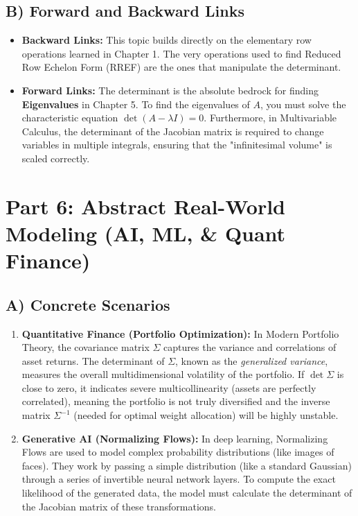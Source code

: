 \documentclass{article}
\begin{document}
\subsection{B) Forward and Backward Links}
\begin{itemize}
    \item \textbf{Backward Links:} This topic builds directly on the elementary row operations learned in Chapter 1. The very operations used to find Reduced Row Echelon Form (RREF) are the ones that manipulate the determinant.
    \item \textbf{Forward Links:} The determinant is the absolute bedrock for finding \textbf{Eigenvalues} in Chapter 5. To find the eigenvalues of $A$, you must solve the characteristic equation $\det(A - \lambda I) = 0$. Furthermore, in Multivariable Calculus, the determinant of the Jacobian matrix is required to change variables in multiple integrals, ensuring that the "infinitesimal volume" is scaled correctly.
\end{itemize}

\section{Part 6: Abstract Real-World Modeling (AI, ML, \& Quant Finance)}

\subsection{A) Concrete Scenarios}
\begin{enumerate}
    \item \textbf{Quantitative Finance (Portfolio Optimization):} In Modern Portfolio Theory, the covariance matrix $\Sigma$ captures the variance and correlations of asset returns. The determinant of $\Sigma$, known as the \textit{generalized variance}, measures the overall multidimensional volatility of the portfolio. If $\det \Sigma$ is close to zero, it indicates severe multicollinearity (assets are perfectly correlated), meaning the portfolio is not truly diversified and the inverse matrix $\Sigma^{-1}$ (needed for optimal weight allocation) will be highly unstable.
    \item \textbf{Generative AI (Normalizing Flows):} In deep learning, Normalizing Flows are used to model complex probability distributions (like images of faces). They work by passing a simple distribution (like a standard Gaussian) through a series of invertible neural network layers. To compute the exact likelihood of the generated data, the model must calculate the determinant of the Jacobian matrix of these transformations.
\end{enumerate}
\end{document}
